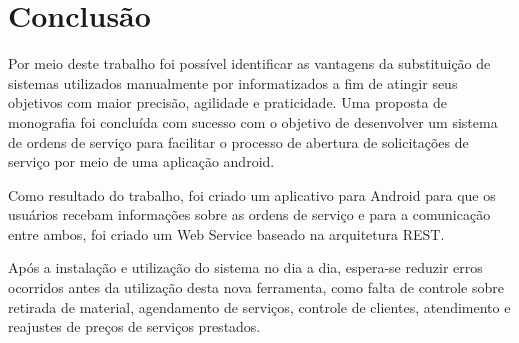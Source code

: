 \chapter{Conclusão}
Por meio deste trabalho foi possível identificar as vantagens da substituição de sistemas utilizados manualmente por informatizados a fim de atingir seus objetivos com maior precisão, agilidade e praticidade. Uma proposta de monografia foi concluída com sucesso com o objetivo de desenvolver um sistema de ordens de serviço para facilitar o processo de abertura de solicitações de serviço por meio de uma aplicação android.

Como resultado do trabalho, foi criado um aplicativo para Android para que os usuários recebam informações sobre as ordens de serviço e para a comunicação entre ambos, foi criado um Web Service baseado na arquitetura REST.

Após a instalação e utilização do sistema no dia a dia, espera-se reduzir erros ocorridos antes da utilização desta nova ferramenta, como falta de controle sobre retirada de material, agendamento de serviços, controle de clientes, atendimento e reajustes de preços de serviços prestados.